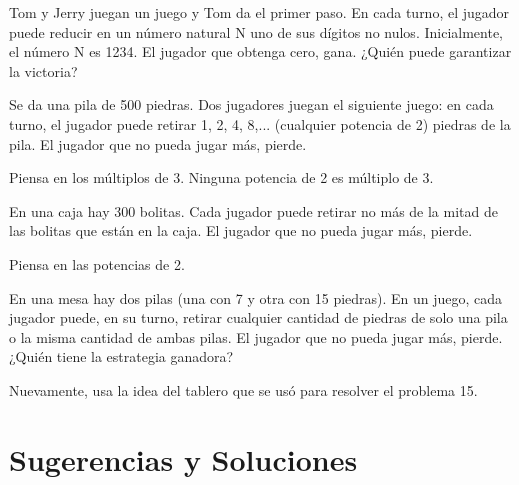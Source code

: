 \documentclass[11pt]{scrartcl}
\begin{document}
\begin{problem}
Tom y Jerry juegan un juego y Tom da el primer paso. En cada turno, el jugador puede reducir en un número natural N uno de sus dígitos no nulos. Inicialmente, el número N es 1234. El jugador que obtenga cero, gana. ¿Quién puede garantizar la victoria?
\end{problem}

\begin{problem}
Se da una pila de 500 piedras. Dos jugadores juegan el siguiente juego: en cada turno, el jugador puede retirar 1, 2, 4, 8,... (cualquier potencia de 2) piedras de la pila. El jugador que no pueda jugar más, pierde.
\begin{hint}
    Piensa en los múltiplos de 3. Ninguna potencia de 2 es múltiplo de 3.
\end{hint}
\end{problem}

\begin{problem}
    En una caja hay 300 bolitas. Cada jugador puede retirar no más de la mitad de las bolitas que están en la caja. El jugador que no pueda jugar más, pierde.
\begin{hint}
     Piensa en las potencias de 2.
\end{hint}
\end{problem}
\begin{problem}
En una mesa hay dos pilas (una con 7 y otra con 15 piedras). En un juego, cada jugador puede, en su turno, retirar cualquier cantidad de piedras de solo una pila o la misma cantidad de ambas pilas. El jugador que no pueda jugar más, pierde. ¿Quién tiene la estrategia ganadora?
\begin{hint}
Nuevamente, usa la idea del tablero que se usó para resolver el problema 15.
\end{hint}
\end{problem}


\section{Sugerencias y Soluciones}
\begin{enumerate}

\end{enumerate}
\end{document}
